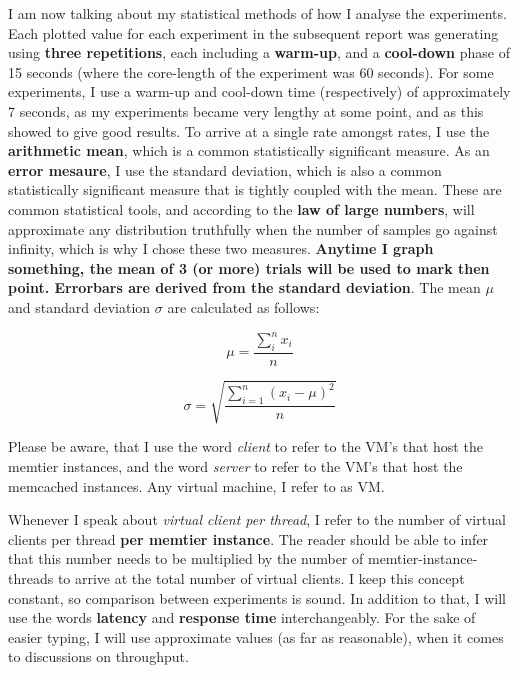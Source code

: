 \documentclass[11pt,a4paper]{article}
\begin{document}
I am now talking about my statistical methods of how I analyse the experiments.
Each plotted value for each experiment in the subsequent report was generating using \textbf{three repetitions}, each including a \textbf{warm-up}, and a \textbf{cool-down} phase of 15 seconds (where the core-length of the experiment was 60 seconds).
For some experiments, I use a warm-up and cool-down time (respectively) of approximately 7 seconds, as my experiments became very lengthy at some point, and as this showed to give good results.
To arrive at a single rate amongst rates, I use the \textbf{arithmetic mean}, which is a common statistically significant measure.
As an \textbf{error mesaure}, I use the standard deviation, which is also a common statistically significant measure that is tightly coupled with the mean.
These are common statistical tools, and according to the \textbf{law of large numbers}, will approximate any distribution truthfully when the number of samples go against infinity, which is why I chose these two measures.
\textbf{Anytime I graph something, the mean of 3 (or more) trials will be used to mark then point. 
Errorbars are derived from the standard deviation}.
The mean $\mu$ and standard deviation $\sigma$ are calculated as follows:

\begin{equation}
\mu = \frac{\sum_i^n x_i} {n}
\end{equation}

\begin{equation}
\sigma = \sqrt{ \frac{\displaystyle\sum_{i=1}^{n}(x_i - \mu)^2} {n} }
\end{equation}

Please be aware, that I use the word \textit{client} to refer to the VM's that host the memtier instances, and the word \textit{server} to refer to the VM's that host the memcached instances.
Any virtual machine, I refer to as VM.

Whenever I speak about \textit{virtual client per thread}, I refer to the number of virtual clients per thread \textbf{per memtier instance}.
The reader should be able to infer that this number needs to be multiplied by the number of memtier-instance-threads to arrive at the total number of virtual clients.
I keep this concept constant, so comparison between experiments is sound.
In addition to that, I will use the words \textbf{latency} and \textbf{response time} interchangeably.
For the sake of easier typing, I will use approximate values (as far as reasonable), when it comes to discussions on throughput.
\end{document}
